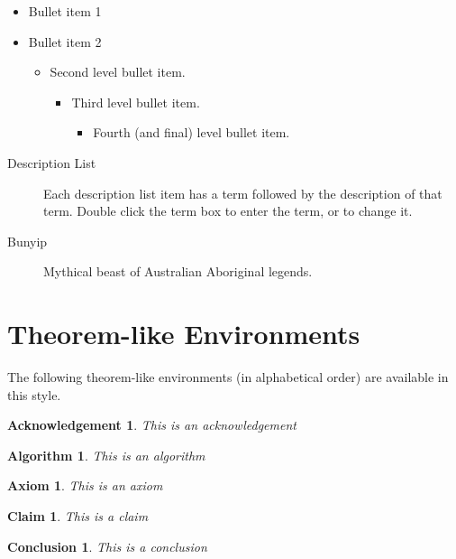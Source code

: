 \documentclass[aps,preprint]{revtex4}%
\newtheorem{acknowledgement}[theorem]{Acknowledgement}
\newtheorem{algorithm}[theorem]{Algorithm}
\newtheorem{axiom}[theorem]{Axiom}
\newtheorem{claim}[theorem]{Claim}
\newtheorem{conclusion}[theorem]{Conclusion}
\begin{document}
\begin{itemize}
\item Bullet item 1

\item Bullet item 2

\begin{itemize}
\item Second level bullet item.

\begin{itemize}
\item Third level bullet item.

\begin{itemize}
\item Fourth (and final) level bullet item.
\end{itemize}
\end{itemize}
\end{itemize}
\end{itemize}

\begin{description}
\item[Description List] Each description list item has a term followed by the
description of that term. Double click the term box to enter the term, or to
change it.

\item[Bunyip] Mythical beast of Australian Aboriginal legends.
\end{description}

\section{Theorem-like Environments}

The following theorem-like environments (in alphabetical order) are available
in this style.

\begin{acknowledgement}
This is an acknowledgement
\end{acknowledgement}

\begin{algorithm}
This is an algorithm
\end{algorithm}

\begin{axiom}
This is an axiom
\end{axiom}

\begin{claim}
This is a claim
\end{claim}

\begin{conclusion}
This is a conclusion
\end{conclusion}
\end{document}
